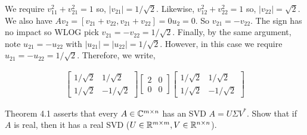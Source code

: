 \documentclass[10pt]{article}
\begin{document}
\begin{solution}[Solution]
\begin{enumerate}
        We require \( v_{11}^2+v_{21}^2 = 1 \) so, \( |v_{21}| = 1/\sqrt{2} \). Likewise, \( v_{12}^2+v_{22}^2=1 \) so, \( |v_{22}|=\sqrt{2} \). We also have \( Av_2 = [v_{21}+v_{22},v_{21}+v_{22}] = 0u_2 = 0 \). So \( v_{21}=-v_{22} \). The sign has no impact so WLOG pick \( v_{21}=-v_{22}=1/\sqrt{2} \). Finally, by the same argument, note \( u_{21}=-u_{22} \) with \( |u_{21}|=|u_{22}|=1/\sqrt{2} \). However, in this case we require \( u_{21}=-u_{22} = 1/\sqrt{2} \).  Therefore, we write,

        \begin{align*}
           \left[\begin{array}{cc}1/\sqrt{2} & 1/\sqrt{2}\\1/\sqrt{2} & -1/\sqrt{2}\end{array}\right]\left[\begin{array}{cc}2 & 0\\0 & 0\end{array}\right] \left[\begin{array}{cc}1/\sqrt{2} & 1/\sqrt{2}\\1/\sqrt{2} & -1/\sqrt{2}\end{array}\right]
        \end{align*}
\end{enumerate}

\end{solution}

\begin{problem}[Exercise 4.5]
Theorem 4.1 asserts that every \( A\in \mathbb{C}^{m\times n} \) has an SVD \( A=U\Sigma V^* \). Show that if \( A \) is real, then it has a real SVD (\( U\in \mathbb{R}^{m\times m}, V\in \mathbb{R}^{n\times n} \)).
\end{problem}
\end{document}
